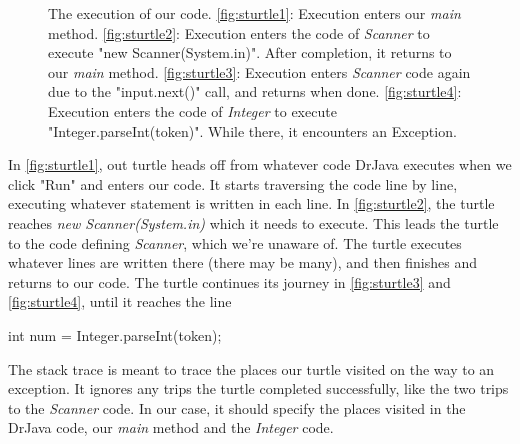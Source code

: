 \begin{figure}[h!]
\caption{The execution of our code. \ref{fig:sturtle1}: Execution enters our \textit{main} method. \ref{fig:sturtle2}: Execution enters the code of \textit{Scanner} to execute "new Scanner(System.in)". After completion, it returns to our \textit{main} method. \ref{fig:sturtle3}: Execution enters \textit{Scanner} code again due to the "input.next()" call, and returns when done. \ref{fig:sturtle4}: Execution enters the code of \textit{Integer} to execute "Integer.parseInt(token)". While there, it encounters an Exception.}
\label{fig:turtles}
\end{figure}



In \ref{fig:sturtle1}, out turtle heads off from whatever code DrJava executes when we click "Run" and enters our code. It starts traversing the code line by line, executing whatever statement is written in each line. In \ref{fig:sturtle2}, the turtle reaches \emph{new Scanner(System.in)} which it needs to execute. This leads the turtle to the code defining \emph{Scanner}, which we're unaware of. The turtle executes whatever lines are written there (there may be many), and then finishes and returns to our code. The turtle continues its journey in \ref{fig:sturtle3} and \ref{fig:sturtle4}, until it reaches the line 

\begin{code}
int num = Integer.parseInt(token);
\end{code}




The stack trace is meant to trace the places our turtle visited on the way to an exception. It ignores any trips the turtle completed successfully, like the two trips to the \emph{Scanner} code. In our case, it should specify the places visited in the DrJava code, our \emph{main} method and the \emph{Integer} code.

